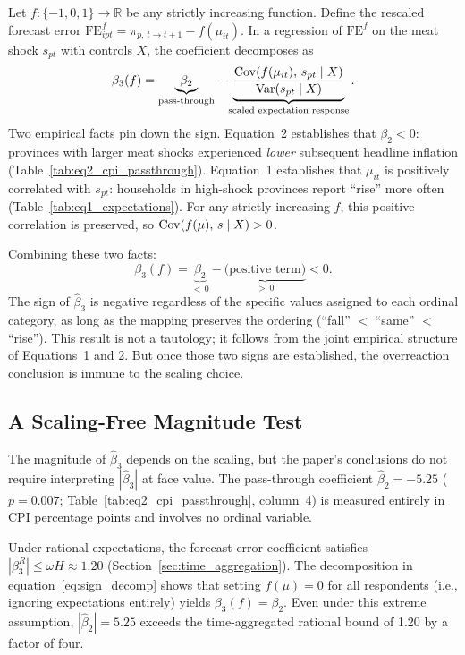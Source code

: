 Let $f\colon \{-1, 0, 1\} \to \mathbb{R}$ be any strictly
increasing function.
Define the rescaled forecast error
$\mathrm{FE}^f_{ipt} = \pi_{p,\,t\to t+1} - f(\mu_{it})$.
In a regression of $\mathrm{FE}^f$ on the meat shock $s_{pt}$
with controls $X$, the coefficient decomposes as
\begin{equation}\label{eq:sign_decomp}
  \beta_3(f)
  = \underbrace{\beta_2}_{\text{pass-through}}
  - \underbrace{%
      \frac{\Cov(f(\mu_{it}),\, s_{pt} \mid X)}%
           {\Var(s_{pt} \mid X)}%
    }_{\text{scaled expectation response}}.
\end{equation}
Two empirical facts pin down the sign.
Equation~2 establishes that $\beta_2 < 0$: provinces
with larger meat shocks experienced \textit{lower} subsequent
headline inflation (Table~\ref{tab:eq2_cpi_passthrough}).
Equation~1 establishes that $\mu_{it}$ is positively
correlated with $s_{pt}$: households in high-shock provinces
report ``rise'' more often
(Table~\ref{tab:eq1_expectations}).
For any strictly increasing $f$, this positive correlation is
preserved, so $\mathrm{Cov}(f(\mu),\, s \mid X) > 0$.

Combining these two facts:
\[
  \beta_3(f) = \underbrace{\beta_2}_{<\,0}
  - \underbrace{\text{(positive term)}}_{>\,0} < 0.
\]
The sign of $\hat{\beta}_3$ is negative regardless of the
specific values assigned to each ordinal category, as long as
the mapping preserves the ordering
(``fall'' $<$ ``same'' $<$ ``rise'').
This result is not a tautology; it follows from the joint
empirical structure of Equations~1 and 2.
But once those two signs are established, the overreaction
conclusion is immune to the scaling choice.

\subsection{A Scaling-Free Magnitude Test}

The magnitude of $\hat{\beta}_3$ depends on the scaling, but
the paper's conclusions do not require interpreting
$|\hat{\beta}_3|$ at face value.
The pass-through coefficient $\hat{\beta}_2 = -5.25$
($p = 0.007$; Table~\ref{tab:eq2_cpi_passthrough}, column~4)
is measured entirely in CPI percentage points and involves no
ordinal variable.

Under rational expectations, the forecast-error coefficient
satisfies $|\beta_3^R| \leq \omega H \approx 1.20$
(Section~\ref{sec:time_aggregation}).
The decomposition in equation~\eqref{eq:sign_decomp} shows
that setting $f(\mu) = 0$ for all respondents (i.e., ignoring
expectations entirely) yields $\beta_3(f) = \beta_2$.
Even under this extreme assumption, $|\hat{\beta}_2| = 5.25$
exceeds the time-aggregated rational bound of 1.20 by a factor
of four.

